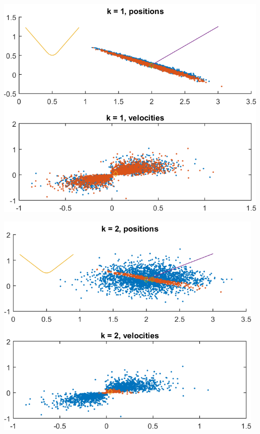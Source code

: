 \documentclass[english,DIV=13]{scrreprt}
\begin{document}
\begin{center}
	\begin{minipage}{.5\textwidth}
		 \includegraphics[width=.98\textwidth]{img/q4_1.png}
	\end{minipage}%
	\begin{minipage}{.5\textwidth}
		\includegraphics[width=0.98\textwidth]{img/q4_2.png}
	\end{minipage}
\end{center}
\end{document}
